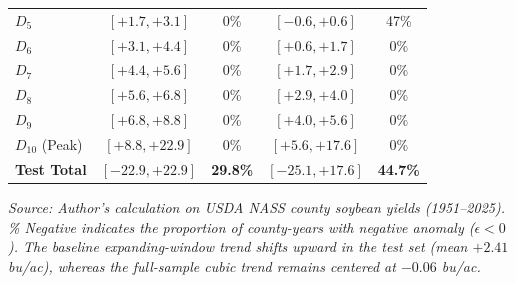 \begin{table}[htbp]
\begin{tabular}{l cc cc}
$D_{5}$ & $[+1.7, +3.1]$ & 0\% & $[-0.6, +0.6]$ & 47\% \\
$D_{6}$ & $[+3.1, +4.4]$ & 0\% & $[+0.6, +1.7]$ & 0\% \\
$D_{7}$ & $[+4.4, +5.6]$ & 0\% & $[+1.7, +2.9]$ & 0\% \\
$D_{8}$ & $[+5.6, +6.8]$ & 0\% & $[+2.9, +4.0]$ & 0\% \\
$D_{9}$ & $[+6.8, +8.8]$ & 0\% & $[+4.0, +5.6]$ & 0\% \\
$D_{10}$ (Peak) & $[+8.8, +22.9]$ & 0\% & $[+5.6, +17.6]$ & 0\% \\
\midrule
\textbf{Test Total} & $[-22.9, +22.9]$ & \textbf{29.8\%} & $[-25.1, +17.6]$ & \textbf{44.7\%} \\
\bottomrule
\end{tabular}
\vspace{0.2em}
{\footnotesize \textit{Source: Author's calculation on USDA NASS county soybean yields (1951--2025). \% Negative indicates the proportion of county-years with negative anomaly ($\epsilon < 0$). The baseline expanding-window trend shifts upward in the test set (mean $+2.41$ bu/ac), whereas the full-sample cubic trend remains centered at $-0.06$ bu/ac.}}
\end{table}